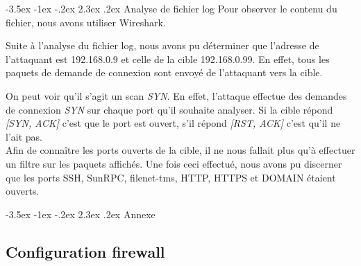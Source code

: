 \documentclass[a4paper,12pt]{article}
\makeatletter
\renewcommand\section{\@startsection {section}{1}{\z@}%
                           {-3.5ex \@plus -1ex \@minus -.2ex}%
                           {2.3ex \@plus.2ex}%
                           {\normalfont\Large\bfseries}}
\makeatother
\begin{document}
\section{Analyse de fichier log}
Pour observer le contenu du fichier, nous avons utiliser Wireshark.

Suite à l'analyse du fichier log, nous avons pu déterminer que l'adresse de l'attaquant est 192.168.0.9 et celle de la cible 192.168.0.99. En effet, 
tous les paquets de demande de connexion sont envoyé de l'attaquant vers la cible.

On peut voir qu'il s'agit un scan \textit{SYN}. En effet, l'attaque effectue des demandes de connexion \textit{SYN} sur chaque port qu'il souhaite analyser.
Si la cible répond \textit{[SYN, ACK]} c'est que le port est ouvert, s'il répond \textit{[RST, ACK]} c'est qu'il ne l'ait pas.\\
Afin de connaître les ports ouverts de la cible, il ne nous fallait plus qu'à effectuer un filtre sur les paquets affichés. Une fois ceci effectué, nous avons
pu discerner que les ports SSH, SunRPC, filenet-tms, HTTP, HTTPS et DOMAIN étaient ouverts.

\newpage
\section{Annexe}
\subsection{Configuration firewall}
 
\end{document}
